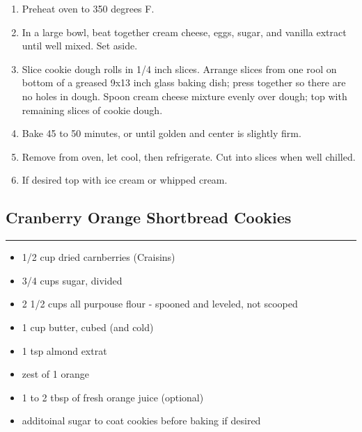 \documentclass{article}
\begin{document}
\begin{enumerate}
    \item 
        Preheat oven to 350 degrees F.
    \item 
        In a large bowl, beat together cream cheese, eggs, sugar, and vanilla extract until well mixed. Set aside.
    \item 
        Slice cookie dough rolls in 1/4 inch slices. Arrange slices from one rool on bottom of a greased 9x13 inch glass baking dish; press together so there are no holes in dough. Spoon cream cheese mixture evenly over dough; top with remaining slices of cookie dough.
    \item 
        Bake 45 to 50 minutes, or until golden and center is slightly firm.
    \item 
        Remove from oven, let cool, then refrigerate. Cut into slices when well chilled.
    \item 
        If desired top with ice cream or whipped cream.
\end{enumerate}
\newpage

\subsection{Cranberry Orange Shortbread Cookies} 
\noindent\rule[0.5ex]{\linewidth}{1pt}

\begin{framed}
    \begin{itemize}
        \item 1/2 cup dried carnberries (Craisins)
        \item 3/4 cups sugar, divided
        \item 2 1/2 cups all purpouse flour - spooned and leveled, not scooped
        \item 1 cup butter, cubed (and cold)
        \item 1 tsp almond extrat
        \item zest of 1 orange
        \item 1 to 2 tbsp of fresh orange juice (optional)
        \item additoinal sugar to coat cookies before baking if desired
    \end{itemize}
\end{framed}
\end{document}
